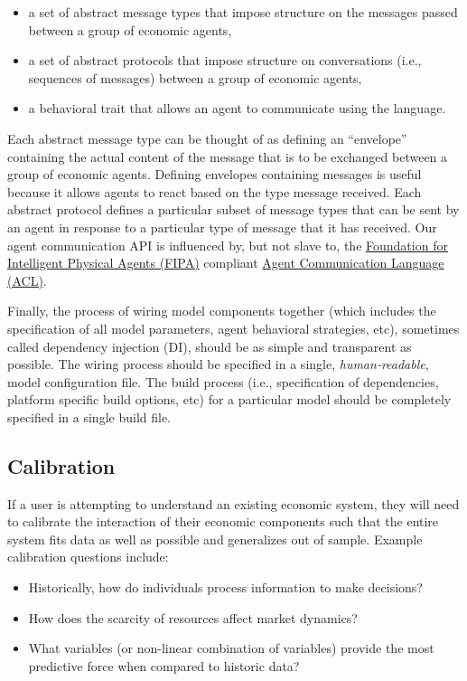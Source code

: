 \documentclass[a4paper]{article}
\begin{document}
\begin{itemize}
    \item a set of abstract message types that impose structure on the messages passed between a group of economic agents,
    \item a set of abstract protocols that impose structure on conversations (i.e., sequences of messages) between a group of economic agents,
    \item a behavioral trait that allows an agent to communicate using the language.
\end{itemize}
Each abstract message type can be thought of as defining an ``envelope'' containing the actual content of the message that is to be exchanged between a group of economic agents. Defining envelopes containing messages is useful because it allows agents to react based on the type message received. Each abstract protocol defines a particular subset of message types that can be sent by an agent in response to a particular type of message that it has received. Our agent communication API is influenced by, but not slave to, the \href{http://www.fipa.org/}{Foundation for Intelligent Physical Agents (FIPA)} compliant \href{http://www.fipa.org/specs/fipa00037/SC00037J.pdf}{Agent Communication Language (ACL)}.

Finally, the process of wiring model components together (which includes the specification of all model parameters, agent behavioral strategies, etc), sometimes called dependency injection (DI), should be as simple and transparent as possible. The wiring process should be specified in a single, \textit{human-readable}, model configuration file. The build process (i.e., specification of dependencies, platform specific build options, etc) for a particular model should be completely specified in a single build file.

\subsection{Calibration}
\label{Calibration}

If a user is attempting to understand an existing economic system, they will need to calibrate the interaction of their economic components such that the entire system fits data as well as possible and generalizes out of sample. Example calibration questions include:

\begin{itemize}
    \item Historically, how do individuals process information to make decisions?
    \item How does the scarcity of resources affect market dynamics? 
	\item What variables (or non-linear combination of variables) provide the most predictive force when compared to historic data?
    \end{itemize}
\end{document}
